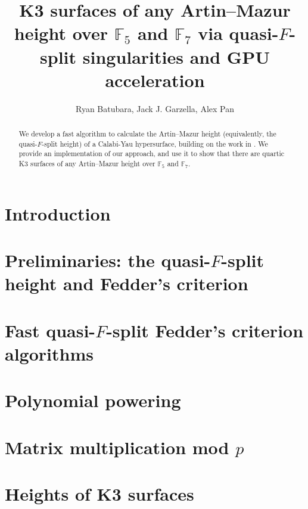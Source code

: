 \documentclass[a4paper]{article}
\title{K3 surfaces of any Artin--Mazur height over \(\mathbb{F}_{5}\) and 
    \(\mathbb{F}_{7}\) via 
quasi-\(F\)-split singularities and GPU acceleration}
\author{Ryan Batubara, Jack J. Garzella, Alex Pan}
\theoremstyle{definition}
\theoremstyle{remark}
\begin{document}
\maketitle

\begin{abstract}
    \noindent We develop a fast algorithm to calculate the Artin--Mazur height (equivalently, the
    quasi-\(F\)-split height) of a Calabi-Yau hypersurface, building on the work in
    \cite{kty-2022-fedder}. 
    We provide an implementation of our approach, and use it to show that there are quartic
    K3 surfaces of any Artin--Mazur height over \(\mathbb{F}_{5}\) and \(\mathbb{F}_7\).
\end{abstract}


\section{Introduction}



\section{Preliminaries: the quasi-\(F\)-split height and Fedder's criterion}
\label{sec:preliminaries}



\section{Fast quasi-\(F\)-split Fedder's criterion algorithms}
\label{sec:alg:momts}



\section{Polynomial powering}



\section{Matrix multiplication mod \(p\)}



\section{Heights of K3 surfaces}
\label{sec:heights:surfaces}



\clearpage



\end{document}
